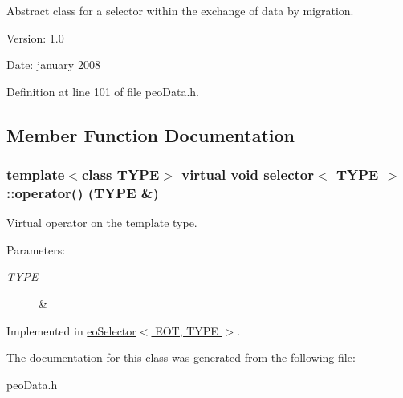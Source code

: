 Abstract class for a selector within the exchange of data by migration. 

\begin{Desc}
\item[Version:]1.0 \end{Desc}
\begin{Desc}
\item[Date:]january 2008 \end{Desc}




Definition at line 101 of file peo\-Data.h.

\subsection{Member Function Documentation}
\hypertarget{classselector_3ca409d57262f397263541753c7fcc28}{
\subsubsection[operator()]{\setlength{\rightskip}{0pt plus 5cm}template$<$class TYPE$>$ virtual void \hyperlink{classselector}{selector}$<$ TYPE $>$::operator() (TYPE \&)}}
\label{classselector_3ca409d57262f397263541753c7fcc28}


Virtual operator on the template type. 

\begin{Desc}
\item[Parameters:]
\begin{description}
\item[{\em TYPE}]\& \end{description}
\end{Desc}


Implemented in \hyperlink{classeoSelector_2f32b10e23e68654e4459bb682aaa4ff}{eo\-Selector$<$ EOT, TYPE $>$}.

The documentation for this class was generated from the following file:\begin{CompactItemize}
\item 
peo\-Data.h\end{CompactItemize}
